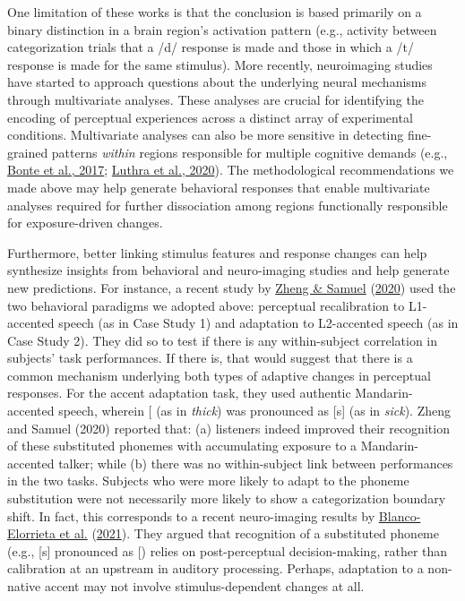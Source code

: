\documentclass[
  11pt,
  english,
  man,floatsintext]{apa6}
\begin{document}
One limitation of these works is that the conclusion is based primarily on a binary distinction in a brain region's activation pattern (e.g., activity between categorization trials that a /d/ response is made and those in which a /t/ response is made for the same stimulus). More recently, neuroimaging studies have started to approach questions about the underlying neural mechanisms through multivariate analyses. These analyses are crucial for identifying the encoding of perceptual experiences across a distinct array of experimental conditions. Multivariate analyses can also be more sensitive in detecting fine-grained patterns \emph{within} regions responsible for multiple cognitive demands (e.g., \protect\hyperlink{ref-bonte2017}{Bonte et al., 2017}; \protect\hyperlink{ref-luthra2020a}{Luthra et al., 2020}). The methodological recommendations we made above may help generate behavioral responses that enable multivariate analyses required for further dissociation among regions functionally responsible for exposure-driven changes.

Furthermore, better linking stimulus features and response changes can help synthesize insights from behavioral and neuro-imaging studies and help generate new predictions. For instance, a recent study by \protect\hyperlink{ref-zheng-samuel2020}{Zheng \& Samuel} (\protect\hyperlink{ref-zheng-samuel2020}{2020}) used the two behavioral paradigms we adopted above: perceptual recalibration to L1-accented speech (as in Case Study 1) and adaptation to L2-accented speech (as in Case Study 2). They did so to test if there is any within-subject correlation in subjects' task performances. If there is, that would suggest that there is a common mechanism underlying both types of adaptive changes in perceptual responses. For the accent adaptation task, they used authentic Mandarin-accented speech, wherein {[}\ipatext{θ}{]} (as in \emph{thick}) was pronounced as {[}s{]} (as in \emph{sick}). Zheng and Samuel (2020) reported that: (a) listeners indeed improved their recognition of these substituted phonemes with accumulating exposure to a Mandarin-accented talker; while (b) there was no within-subject link between performances in the two tasks. Subjects who were more likely to adapt to the phoneme substitution were not necessarily more likely to show a categorization boundary shift. In fact, this corresponds to a recent neuro-imaging results by \protect\hyperlink{ref-blanco-elorriera2021}{Blanco-Elorrieta et al.} (\protect\hyperlink{ref-blanco-elorriera2021}{2021}). They argued that recognition of a substituted phoneme (e.g., {[}s{]} pronounced as {[}\ipatext{ʃ}{]}) relies on post-perceptual decision-making, rather than calibration at an upstream in auditory processing. Perhaps, adaptation to a non-native accent may not involve stimulus-dependent changes at all.
\end{document}
